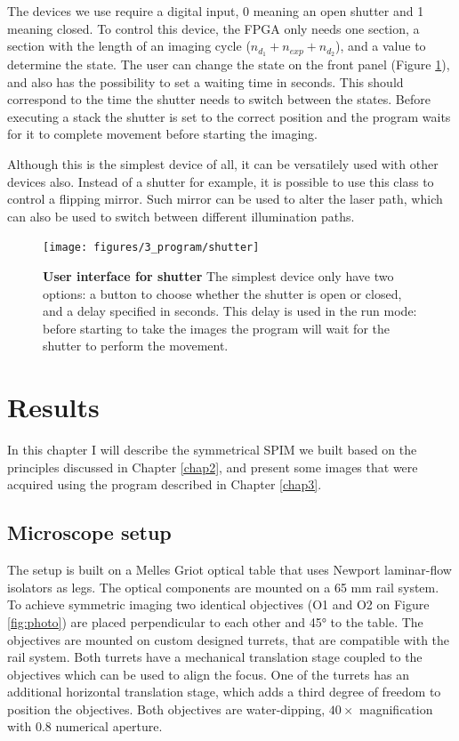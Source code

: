 \documentclass{diploma_style}
\begin{document}
The devices we use require a digital input, 0 meaning an open shutter and 1 meaning closed. To control this device, the FPGA only needs one section, a section with the length of an imaging cycle ($n_{d_1}+n_{exp}+n_{d_2}$), and a value to determine the state. The user can change the state on the front panel (Figure \ref{fig:ui_shutter}), and also has the possibility to set a waiting time in seconds. This should correspond to the time the shutter needs to switch between the states. Before executing a stack the shutter is set to the correct position and the program waits for it to complete movement before starting the imaging.

Although this is the simplest device of all, it can be versatilely used with other devices also. Instead of a shutter for example, it is possible to use this class to control a flipping mirror. Such mirror can be used to alter the laser path, which can also be used to switch between different illumination paths.

\begin{figure}[htbp]
	\centering
	\texttt{[image: figures/3\_program/shutter]}
	\caption{\textbf{User interface for shutter} The simplest device only have two options: a button to choose whether the shutter is open or closed, and a delay specified in seconds. This delay is used in the run mode: before starting to take the images the program will wait for the shutter to perform the movement.}
	\label{fig:ui_shutter}
\end{figure}







\chapter{Results}
\label{chap4}

In this chapter I will describe the symmetrical SPIM we built based on the principles discussed in Chapter \ref{chap2}, and present some images that were acquired using the program described in Chapter \ref{chap3}.

\section{Microscope setup}
The setup is built on a Melles Griot optical table that uses Newport laminar-flow isolators as legs. The optical components are mounted on a 65 mm rail system. To achieve symmetric imaging two identical objectives (O1 and O2 on Figure \ref{fig:photo}) are placed perpendicular to each other and 45° to the table. The objectives are mounted on custom designed turrets, that are compatible with the rail system. Both turrets have a mechanical translation stage coupled to the objectives which can be used to align the focus. One of the turrets has an additional horizontal translation stage, which adds a third degree of freedom to position the objectives. Both objectives are water-dipping, $40\times$ magnification with 0.8 numerical aperture.
\end{document}
